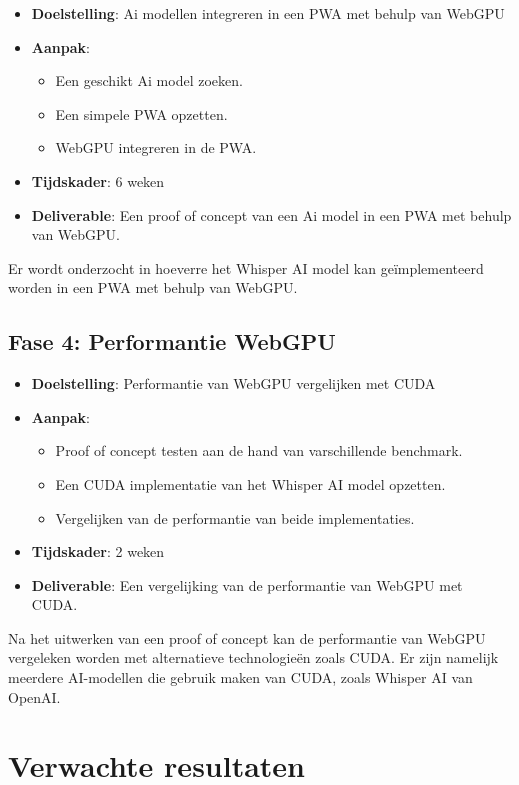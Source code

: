 \documentclass{hogent-article}
\begin{document}
\begin{itemize}
\item \textbf{Doelstelling}: Ai modellen integreren in een PWA met behulp van WebGPU
\item \textbf{Aanpak}:
\begin{itemize}
\item Een geschikt Ai model zoeken.
\item Een simpele PWA opzetten.
\item WebGPU integreren in de PWA.
\end{itemize}
\item \textbf{Tijdskader}: 6 weken
\item \textbf{Deliverable}: Een proof of concept van een Ai model in een PWA met behulp van WebGPU.
\end{itemize}
Er wordt onderzocht in hoeverre het Whisper AI model kan geïmplementeerd worden in een PWA met behulp van WebGPU.

\subsection*{Fase 4: Performantie WebGPU}

\begin{itemize}
\item \textbf{Doelstelling}: Performantie van WebGPU vergelijken met CUDA
\item \textbf{Aanpak}:
\begin{itemize}
\item Proof of concept testen aan de hand van varschillende benchmark.
\item Een CUDA implementatie van het Whisper AI model opzetten.
\item Vergelijken van de performantie van beide implementaties.
\end{itemize}
\item \textbf{Tijdskader}: 2 weken
\item \textbf{Deliverable}: Een vergelijking van de performantie van WebGPU met CUDA.
\end{itemize}

Na het uitwerken van een proof of concept kan de performantie van WebGPU vergeleken worden met alternatieve technologieën zoals CUDA.
Er zijn namelijk meerdere AI-modellen die gebruik maken van CUDA, zoals Whisper AI van OpenAI.

\section{Verwachte resultaten}
\label{sec:verwachte-resultaten}
\end{document}

